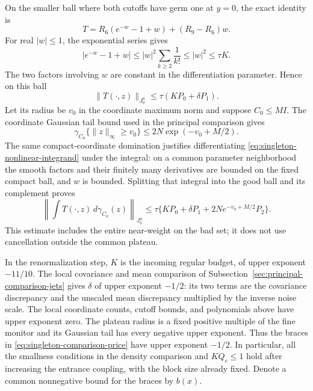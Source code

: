 On the smaller ball where both cutoffs have germ one at $y=0$,
the exact identity is
\[
 T=R_6(e^{-w}-1+w)+(R_9-R_6)w.
\]
For real $|w|\le1$, the exponential series gives
\[
 |e^{-w}-1+w|
 \le |w|^2\sum_{k\ge2}\frac1{k!}
 \le |w|^2\le\tau K.
\]
The two factors involving $w$ are constant in the differentiation
parameter. Hence on this ball
\begin{equation}\label{eq:singleton-good-price}
              \|T(\cdot,z)\|_{J^n_0}
                    \le\tau(KP_0+\delta P_1).
\end{equation}
Let its radius be $v_0$ in the coordinate maximum norm and suppose
$C_0\le MI$. The coordinate Gaussian tail bound used in the principal
comparison gives
\[
 \gamma_{C_0}\{\|z\|_\infty\ge v_0\}
                      \le 2N\exp(-v_0+M/2).
\]
The same compact-coordinate domination justifies differentiating
\eqref{eq:singleton-nonlinear-integrand} under the integral: on a
common parameter neighborhood the smooth factors and their finitely
many derivatives are bounded on the fixed compact ball, and $w$ is
bounded. Splitting that integral into the good ball and its complement
proves
\begin{equation}\label{eq:singleton-comparison-price}
 \left\|\int T(\cdot,z)\,d\gamma_{C_0}(z)\right\|_{J^n_0}
 \le \tau\{KP_0+\delta P_1
                +2N e^{-v_0+M/2}P_2\}.
\end{equation}
This estimate includes the entire near-weight on the bad set; it does
not use cancellation outside the common plateau.

In the renormalization step, $K$ is the incoming regular budget, of
upper exponent $-11/10$. The local covariance and mean comparison of
Subsection~\ref{sec:principal-comparison-jets} gives $\delta$ of upper
exponent $-1/2$: its two terms are the covariance discrepancy and the
unscaled mean discrepancy multiplied by the inverse noise scale.
The local coordinate counts, cutoff bounds, and polynomials above have
upper exponent zero. The plateau radius is a fixed positive multiple
of the fine monitor and its Gaussian tail has every negative upper
exponent. Thus the braces in \eqref{eq:singleton-comparison-price}
have upper exponent $-1/2$. In particular, all the smallness conditions
in the density comparison and $KQ_c\le1$ hold after increasing the
entrance coupling, with the block size already fixed. Denote a common
nonnegative bound for the braces by $b(x)$.

